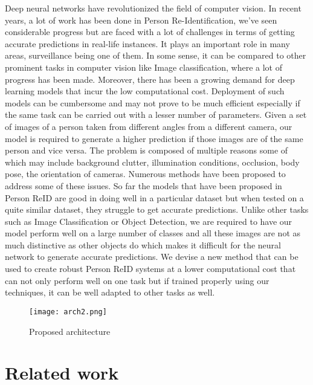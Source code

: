 \documentclass[10pt,twocolumn,letterpaper]{article}
\begin{document}
Deep neural networks have revolutionized the field of computer vision. In recent years, a lot of work has been done in Person Re-Identification, we've seen considerable progress but are faced with a lot of challenges in terms of getting accurate predictions in real-life instances. It plays an important role in many areas, surveillance being one of them. In some sense, it can be compared to other prominent tasks in computer vision like Image classification, where a lot of progress has been made. Moreover, there has been a growing demand for deep learning models that incur the low computational cost. Deployment of such models can be cumbersome and may not prove to be much efficient especially if the same task can be carried out with a lesser number of parameters. Given a set of images of a person taken from different angles from a different camera, our model is required to generate a higher prediction if those images are of the same person and vice versa. The problem is composed of multiple reasons some of which may include background clutter, illumination conditions, occlusion, body pose, the orientation of cameras. Numerous methods have been proposed to address some of these issues. So far the models that have been proposed in Person ReID are good in doing well in a particular dataset but when tested on a quite similar dataset, they struggle to get accurate predictions. Unlike other tasks such as Image Classification or Object Detection, we are required to have our model perform well on a large number of classes and all these images are not as much distinctive as other objects do which makes it difficult for the neural network to generate accurate predictions. We devise a new method that can be used to create robust Person ReID systems at a lower computational cost that can not only perform well on one task but if trained properly using our techniques, it can be well adapted to other tasks as well.



\begin{figure*}
\texttt{[image: arch2.png]}
\caption{Proposed architecture}
\end{figure*}
\section{Related work}
\end{document}

